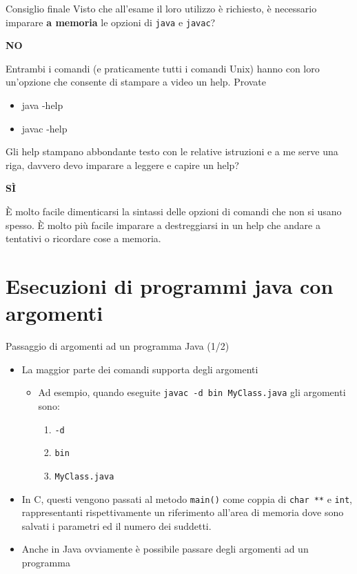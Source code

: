 \documentclass[presentation]{beamer}
\begin{document}
\begin{frame}{Consiglio finale}
  Visto che all'esame il loro utilizzo è richiesto, è necessario imparare \textbf{a memoria} le opzioni di \texttt{java} e \texttt{javac}?
  \begin{center}
    \textbf{NO}
  \end{center}
  Entrambi i comandi (e praticamente tutti i comandi Unix) hanno con loro un'opzione che consente di stampare a video un help. Provate
  \begin{block}{}
    \begin{itemize}
      \item java -help
      \item javac -help
    \end{itemize}
  \end{block}
  \vspace{10pt}
  
  Gli help stampano abbondante testo con le relative istruzioni e a me serve una riga, davvero devo imparare a leggere e capire un help?
  \begin{center}
    \textbf{SÌ}
  \end{center}
  È molto facile dimenticarsi la sintassi delle opzioni di comandi che non si usano spesso. È molto più facile imparare a destreggiarsi in un help che andare a tentativi o ricordare cose a memoria.
\end{frame}

\section{Esecuzioni di programmi java con argomenti}

\begin{frame}{Passaggio di argomenti ad un programma Java (1/2)}
	\begin{itemize}\itemsep10pt
		\item La maggior parte dei comandi supporta degli argomenti
		\begin{itemize}
			\item Ad esempio, quando eseguite \texttt{javac -d bin MyClass.java} gli argomenti sono:
			\begin{enumerate}
			 \item \texttt{-d}
			 \item \texttt{bin}
			 \item \texttt{MyClass.java}
			\end{enumerate}
		\end{itemize}
		\item In C, questi vengono passati al metodo \texttt{main()} come coppia di \texttt{char **} e \texttt{int}, rappresentanti rispettivamente un riferimento all'area di memoria dove sono salvati i parametri ed il numero dei suddetti.
		\item Anche in Java ovviamente è possibile passare degli argomenti ad un programma 
		\end{itemize}
\end{frame}
\end{document}
